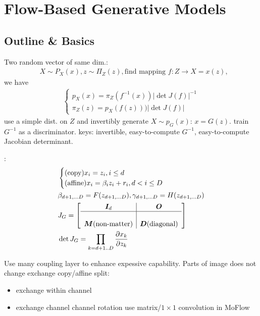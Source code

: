 \documentclass{article}
\begin{document}
\section{Flow-Based Generative Models}

\subsection{Outline \& Basics}

    Two random vector of same dim.: 
    \begin{align}
        &X\sim P_X(x), z\sim \Pi_Z(z), \text{find mapping } f:Z\rightarrow X=x(z), 
    \end{align}
    we have 
    \begin{align}
        \begin{cases}
            p_X(x)=\pi_Z(f^{-1}(x))\left|\det J(f)\right|^{-1}\\
            \pi_Z(z)=p_X(f(z)))\left|\det J(f)\right|
        \end{cases}
    \end{align}
    use a simple dist. on $Z$ and invertibly generate $X\sim p_G(x)$: $x=G(z)$. train $G^{-1}$ as a discriminator.
    keys: invertible, easy-to-compute $G^{-1}$, easy-to-compute Jacobian determinant.

    :
    \begin{align}
        &\begin{cases}
            \text{(copy)} x_i = z_i, i\le d\\
            \text{(affine)} x_i = \beta_i z_i + r_i, d < i \le D
        \end{cases}\\
        & \beta_{d+1,...D}=F(z_{d+1,...D}), \gamma_{d+1,...D}=H(z_{d+1,...D})\\
        & J_G=\left[\begin{array}{c|c}
            \boldsymbol{I}_d &\boldsymbol{O}\\
            \hline\\
            \boldsymbol{M}\text{(non-matter)} &\boldsymbol{D}\text{(diagonal)}
        \end{array}
        \right]\\
        & \det J_G = \prod_{k=d+1..D}\frac{\partial x_k}{\partial z_k}
    \end{align}

    Use many coupling layer to enhance expessive capability. Parts of image does not change \trarr exchange copy/affine split:
    \begin{itemize}
        \item exchange within channel
        \item exchange channel \trarr channel rotation use matrix/$1\times 1$ convolution in MoFlow
    \end{itemize}
\end{document}
